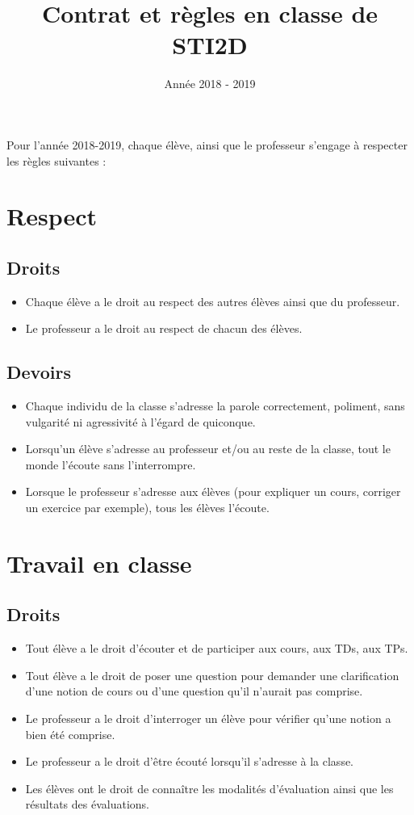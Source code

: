 \documentclass[10pt,fleqn]{article} %
\begin{document}
\title{Contrat et règles en classe de STI2D}
\date{Année 2018 - 2019}

Pour l'année 2018-2019, chaque élève, ainsi que le professeur s'engage à respecter les règles suivantes : 
\section{Respect}
\subsection{Droits}
\begin{itemize}
    \item Chaque élève a le droit au respect des autres élèves ainsi que du professeur. 
    \item Le professeur a le droit au respect de chacun des élèves.
\end{itemize}

\subsection{Devoirs}
\begin{itemize}
    \item Chaque individu de la classe s'adresse la parole correctement, poliment, sans vulgarité ni agressivité à l'égard de quiconque. 
    \item Lorsqu'un élève s'adresse au professeur et/ou au reste de la classe, tout le monde l'écoute sans l'interrompre. 
    \item Lorsque le professeur s'adresse aux élèves (pour expliquer un cours, corriger un exercice par exemple), tous les élèves l'écoute.
\end{itemize}

\section{Travail en classe}
\subsection{Droits}
\begin{itemize}
    \item Tout élève a le droit d'écouter et de participer aux cours, aux TDs, aux TPs.
    \item Tout élève a le droit de poser une question pour demander une clarification d'une notion de cours ou d'une question qu'il n'aurait pas comprise. 
    \item Le professeur a le droit d'interroger un élève pour vérifier qu'une notion a bien été comprise.
    \item Le professeur a le droit d'être écouté lorsqu'il s'adresse à la classe. 
    \item Les élèves ont le droit de connaître les modalités d'évaluation ainsi que les résultats des évaluations. 
\end{itemize}
\end{document}
